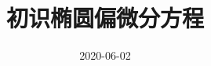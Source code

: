 \documentclass[xcolor=svgnames,serif,table,10pt]{beamer}
\title{初识椭圆偏微分方程}
\author[王允磊]
{\makebox[4em][s]{王允磊}}
\institute[CUG]{\texttt{[image: cug.jpeg]}}
\date{\tiny 2020-06-02}
\begin{document}
\setlength{\abovedisplayskip}{1ex}%
\setlength{\belowdisplayskip}{1ex}%


\begin{frame}
  \titlepage
\end{frame}


\end{document}
